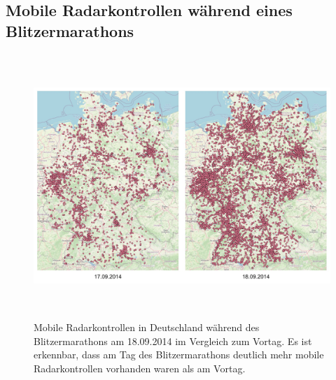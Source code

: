 \subsection{Mobile Radarkontrollen während eines Blitzermarathons}
\label{sec:AnhangDiagramme}

\begin{figure}[h]
    \centering
    \includegraphics[width=1.0\textwidth,height=10cm,keepaspectratio=true]{content/images/BlitzerMarathonSep2014Vgl.jpeg}
    \caption{Mobile Radarkontrollen in Deutschland während des Blitzermarathons am 18.09.2014 im Vergleich zum Vortag.
    Es ist erkennbar, dass am Tag des Blitzermarathons deutlich mehr mobile Radarkontrollen vorhanden waren als am Vortag.}
    \label{fig:BlitzerMarathonSep2014Vgl}
\end{figure}
